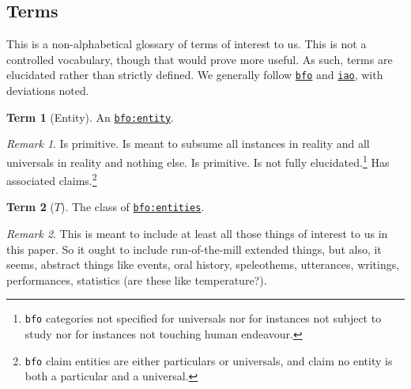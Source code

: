 \documentclass{amsart}%
\newcommand{\code}[1]{\texttt{#1}}%
\theoremstyle{plain}
\theoremstyle{definition}
\theoremstyle{remark}
\theoremstyle{definition}
\newtheorem{term}{Term}[subsection]%
\theoremstyle{remark}
\newtheorem*{term-note}{Remark}
\begin{document}
\subsection{Terms}
\label{ss:terms}
This is a non-alphabetical glossary of terms of interest to us. This is not a controlled vocabulary, though that would prove more useful. As such, terms are elucidated rather than strictly defined. We generally follow \href{https://www.ebi.ac.uk/ols4/ontologies/bfo}{\code{bfo}} and \href{https://www.ebi.ac.uk/ols4/ontologies/iao}{\code{iao}}, with deviations noted.
%
%
%
\begin{term}[Entity]
\label{term:entity}
An \href{http://purl.obolibrary.org/obo/BFO_0000001}{\code{bfo:entity}}.
\begin{term-note}
Is primitive. Is meant to subsume all instances in reality %
and all universals in reality and nothing else. Is primitive. Is not fully elucidated.\footnote{\code{bfo} categories not specified for universals nor for instances not subject to study nor for instances not touching human endeavour.} %
Has associated claims.\footnote{\code{bfo} claim entities are either particulars or universals, and claim no entity is both a particular and a universal.}
\end{term-note}
\end{term}
%
%
%
\begin{term}[\(T\)]
\label{term:t}
The class of \href{http://purl.obolibrary.org/obo/BFO_0000001}{\code{bfo:entities}}.%
\begin{term-note}
This is meant to include at least all those things of interest to us in this paper. So it ought to include run-of-the-mill extended things, but also, it seems, abstract things like events, oral history, speleothems, utterances, writings, performances, statistics (are these like temperature?).
\end{term-note}
\end{term}
%
%
%
\end{document}
